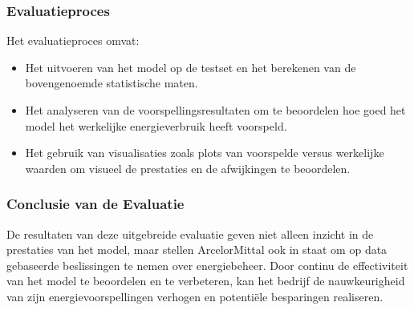 \subsubsection{Evaluatieproces}
Het evaluatieproces omvat:
\begin{itemize}
    \item Het uitvoeren van het model op de testset en het berekenen van de bovengenoemde statistische maten.
    \item Het analyseren van de voorspellingsresultaten om te beoordelen hoe goed het model het werkelijke energieverbruik heeft voorspeld.
    \item Het gebruik van visualisaties zoals plots van voorspelde versus werkelijke waarden om visueel de prestaties en de afwijkingen te beoordelen.
\end{itemize}

\subsubsection{Conclusie van de Evaluatie}
De resultaten van deze uitgebreide evaluatie geven niet alleen inzicht in de prestaties van het model, maar stellen ArcelorMittal ook in staat om op data gebaseerde beslissingen te nemen over energiebeheer. Door continu de effectiviteit van het model te beoordelen en te verbeteren, kan het bedrijf de nauwkeurigheid van zijn energievoorspellingen verhogen en potentiële besparingen realiseren.



